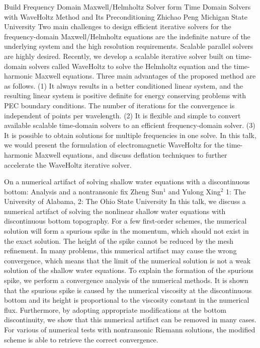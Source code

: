 \vspace{1.5ex}
\abs
{Build Frequency Domain Maxwell/Helmholtz Solver form Time Domain Solvers with WaveHoltz Method and Its Preconditioning}
{Zhichao Peng}
{Michigan State University}
{Two main challenges to design efficient iterative solvers for the frequency-domain Maxwell/Helmholtz equations are the indefinite nature of the underlying system and the high resolution requirements. Scalable parallel solvers are highly desired. Recently, we develop a scalable iterative solver built on time-domain solvers called WaveHoltz to solve the Helmholtz equation and the time-harmonic Maxwell equations. Three main advantages of the proposed method are as follows. (1) It always results in a better conditioned linear system, and the resulting linear system is positive definite for energy conserving problems with PEC boundary conditions. The number of iterations for the convergence is independent of points per wavelength. (2) It is flexible and simple to convert available scalable time-domain solvers to an efficient frequency-domain solver. (3) It is possible to obtain solutions for multiple frequencies in one solve.  In this talk, we would present the formulation of electromagnetic WaveHoltz for the time-harmonic Maxwell equations, and discuss deflation techniques to further accelerate the WaveHoltz iterative solver.}


\vspace{1.5ex}
\abs
{On a numerical artifact of solving shallow water equations with a discontinuous bottom: Analysis and a nontransonic fix} 
{Zheng Sun$^{1}$ and Yulong Xing$^{2}$} 
{1: The University of Alabama, 2: The Ohio State University} 
{In this talk, we discuss a numerical artifact of solving the nonlinear shallow water equations with discontinuous bottom topography. For a few first-order schemes, the numerical solution will form a spurious spike in the momentum, which should not exist in the exact solution. The height of the spike cannot be reduced by the mesh refinement. In many problems, this numerical artifact may cause the wrong convergence, which means that the limit of the numerical solution is not a weak solution of the shallow water equations. To explain the formation of the spurious spike, we perform a convergence analysis of the numerical methods. It is shown that the spurious spike is caused by the numerical viscosity at the discontinuous bottom and its height is proportional to the viscosity constant in the numerical flux. Furthermore, by adopting appropriate modifications at the bottom discontinuity, we show that this numerical artifact can be removed in many cases. For various of numerical tests with nontransonic Riemann solutions, the modified scheme is able to retrieve the correct convergence.}


